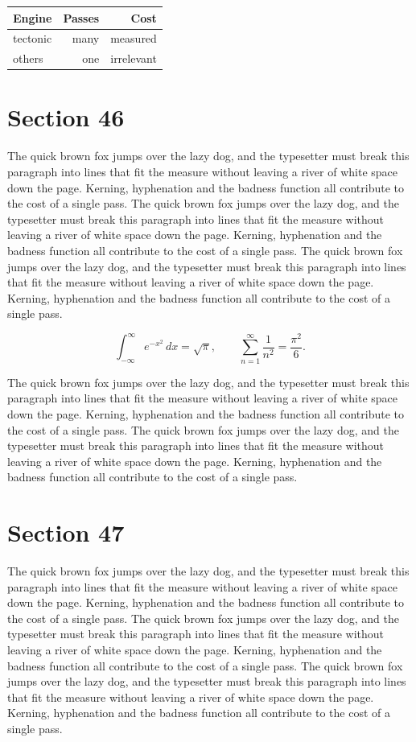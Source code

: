 \documentclass{article}
\begin{document}
\begin{center}
\begin{tabular}{lrr}
\toprule
Engine & Passes & Cost \\
\midrule
tectonic & many & measured \\
others & one & irrelevant \\
\bottomrule
\end{tabular}
\end{center}

\section{Section 46}
The quick brown fox jumps over the lazy dog, and the typesetter must break this paragraph into lines that fit the measure without leaving a river of white space down the page. Kerning, hyphenation and the badness function all contribute to the cost of a single pass. The quick brown fox jumps over the lazy dog, and the typesetter must break this paragraph into lines that fit the measure without leaving a river of white space down the page. Kerning, hyphenation and the badness function all contribute to the cost of a single pass. The quick brown fox jumps over the lazy dog, and the typesetter must break this paragraph into lines that fit the measure without leaving a river of white space down the page. Kerning, hyphenation and the badness function all contribute to the cost of a single pass. 

\begin{equation}
\int_{-\infty}^{\infty} e^{-x^{2}}\,dx = \sqrt{\pi}, \qquad
\sum_{n=1}^{\infty} \frac{1}{n^{2}} = \frac{\pi^{2}}{6}.
\end{equation}

The quick brown fox jumps over the lazy dog, and the typesetter must break this paragraph into lines that fit the measure without leaving a river of white space down the page. Kerning, hyphenation and the badness function all contribute to the cost of a single pass. The quick brown fox jumps over the lazy dog, and the typesetter must break this paragraph into lines that fit the measure without leaving a river of white space down the page. Kerning, hyphenation and the badness function all contribute to the cost of a single pass. 
\section{Section 47}
The quick brown fox jumps over the lazy dog, and the typesetter must break this paragraph into lines that fit the measure without leaving a river of white space down the page. Kerning, hyphenation and the badness function all contribute to the cost of a single pass. The quick brown fox jumps over the lazy dog, and the typesetter must break this paragraph into lines that fit the measure without leaving a river of white space down the page. Kerning, hyphenation and the badness function all contribute to the cost of a single pass. The quick brown fox jumps over the lazy dog, and the typesetter must break this paragraph into lines that fit the measure without leaving a river of white space down the page. Kerning, hyphenation and the badness function all contribute to the cost of a single pass. 
\end{document}
